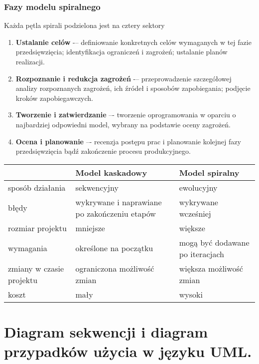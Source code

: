 \documentclass[main.tex]{subfiles}
\begin{document}
    \subsubsection{Fazy modelu spiralnego}
    Każda pętla spirali podzielona jest na cztery sektory
    \begin{enumerate}
        \item \textbf{Ustalanie celów} -– definiowanie konkretnych celów wymaganych w tej fazie przedsięwzięcia;
        identyfikacja ograniczeń i zagrożeń; ustalanie planów realizacji.
        \item \textbf{Rozpoznanie i redukcja zagrożeń} -– przeprowadzenie szczegółowej analizy rozpoznanych zagrożeń,
        ich źródeł i sposobów zapobiegania; podjęcie kroków zapobiegawczych.
        \item \textbf{Tworzenie i zatwierdzanie} –- tworzenie oprogramowania w oparciu o najbardziej odpowiedni model,
        wybrany na podstawie oceny zagrożeń.
        \item \textbf{Ocena i planowanie} –- recenzja postępu prac i planowanie kolejnej fazy przedsięwzięcia bądź
        zakończenie procesu produkcyjnego.
    \end{enumerate}


    \begin{table}[H]
        \centering
        \begin{tabular}{|p{4.8cm}||p{5.5cm}|p{5.5cm}|}
            \hline
            &\textbf{Model kaskadowy} & \textbf{Model spiralny}\\
            \hline
            \hline
            sposób działania & sekwencyjny & ewolucyjny\\
            \hline
            błędy & wykrywane i naprawiane po zakończeniu etapów & wykrywane wcześniej\\
            \hline
            rozmiar projektu & mniejsze & większe\\
            \hline
            wymagania & określone na początku & mogą być dodawane po iteracjach\\
            \hline
            zmiany w czasie projektu & ograniczona możliwość zmian & większa możliwość zmian\\
            \hline
            koszt & mały & wysoki\\
            \hline
        \end{tabular}
    \end{table}


    \section{Diagram sekwencji i diagram przypadków użycia w języku UML.}\label{sec:uml}
\end{document}
